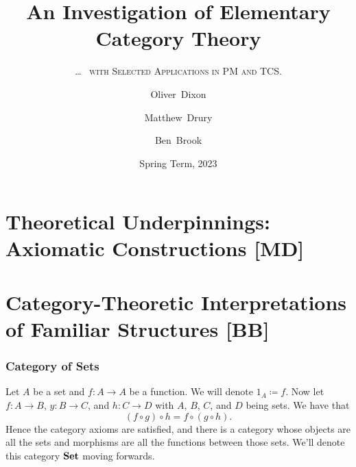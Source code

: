 \documentclass{beamer}
\title[Elementary Category Theory]%
{An Investigation of Elementary Category Theory}
\subtitle{\ldots\ \fontfamily{lmr}%
        \textsc{with Selected Applications in PM and TCS.}}
\author[Dixon, Drury \& Brook]%
{Oliver~Dixon \and Matthew~Drury \and Ben~Brook}
\institute[]{Department of Mathematics, University of York}
\date{Spring Term, 2023}
\numberwithin{figure}{section}
\DeclareMathOperator{\catset}{\text{\textbf{Set}}}
\begin{document}

\frame{\titlepage}

\section{Theoretical Underpinnings: Axiomatic Constructions [MD]}
\begin{frame}
        
\end{frame}
\section{Category-Theoretic Interpretations of Familiar Structures [BB]}
\begin{frame}
        \frametitle{Category of Sets}
        Let $A$ be a set and $f \colon A \to A$ be a function. We will denote
        $1_A \coloneqq f$.  Now let $f \colon A \to B$, $y \colon B \to C$, and
        $h \colon C \to D$ with $A$, $B$, $C$, and $D$ being sets. We have that
        \begin{equation*}
                \left( f \circ g \right) \circ h = f \circ \left( g \circ h
                \right) .
        \end{equation*}
        Hence the category axioms are satisfied, and there is a category whose
        objects are all the sets and morphisms are all the functions between
        those sets. We'll denote this category $\catset$ moving forwards.
\end{frame}
\end{document}
